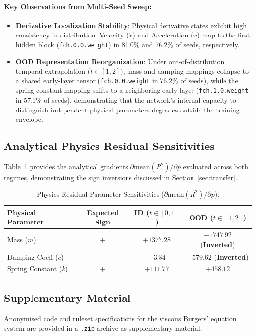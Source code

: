 \documentclass{article}
\begin{document}
\paragraph{Key Observations from Multi-Seed Sweep:}
\begin{itemize}
    \item \textbf{Derivative Localization Stability}: Physical derivative states exhibit high consistency in-distribution. Velocity ($\dot{x}$) and Acceleration ($\ddot{x}$) map to the first hidden block (\texttt{fch.0.0.weight}) in 81.0\% and 76.2\% of seeds, respectively.
    \item \textbf{OOD Representation Reorganization}: Under out-of-distribution temporal extrapolation ($t \in [1, 2]$), mass and damping mappings collapse to a shared early-layer tensor (\texttt{fch.0.0.weight} in 76.2\% of seeds), while the spring-constant mapping shifts to a neighboring early layer (\texttt{fch.1.0.weight} in 57.1\% of seeds), demonstrating that the network's internal capacity to distinguish independent physical parameters degrades outside the training envelope.
\end{itemize}

\subsection{Analytical Physics Residual Sensitivities}
Table~\ref{tab:sensitivities} provides the analytical gradients $\partial \text{mean}(R^2)/\partial p$ evaluated across both regimes, demonstrating the sign inversions discussed in Section~\ref{sec:transfer}.

\begin{table}[h]
\caption{Physics Residual Parameter Sensitivities ($\partial \text{mean}(R^2)/\partial p$).}
\label{tab:sensitivities}
\centering
\small
\begin{tabular}{lccc}
\toprule
Physical Parameter & Expected Sign & ID ($t \in [0, 1]$) & OOD ($t \in [1, 2]$) \\
\midrule
Mass ($m$)                  & $+$ & $+1377.28$ & $-1747.92$ (\textbf{Inverted}) \\
Damping Coeff ($c$)         & $-$ & $-3.84$    & $+579.62$ (\textbf{Inverted}) \\
Spring Constant ($k$)       & $+$ & $+111.77$  & $+458.12$ \\
\bottomrule
\end{tabular}
\end{table}

\subsection{Supplementary Material}
Anonymized code and ruleset specifications for the viscous Burgers' equation system are provided in a \texttt{.zip} archive as supplementary material.
\end{document}
